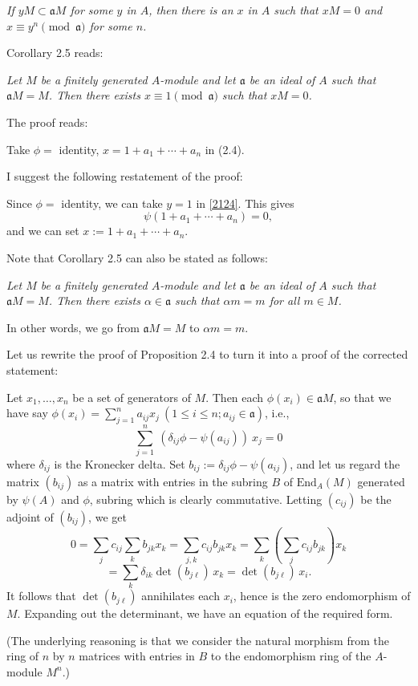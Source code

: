 \documentclass[parskip=half,fontsize=12pt]{scrartcl}%
\newcommand{\mf}{\mathfrak}
\newcommand{\aaa}{\mf a}
\begin{document}
\emph{If $yM\subset\aaa M$ for some $y$ in $A$, then there is an $x$ in $A$ such that $xM=0$ and $x\equiv y^n\pmod{\aaa}$ for some $n$.}

Corollary 2.5 reads:

\emph{Let $M$ be a finitely generated $A$-module and let $\aaa$ be an ideal of $A$ such that $\aaa M=M$. Then there exists $x\equiv1\pmod{\aaa}$ such that $xM=0$.}

The proof reads:

Take $\phi=$ identity, $x=1+a_1+\cdots+a_n$ in (2.4).

I suggest the following restatement of the proof:

Since $\phi=$ identity, we can take $y=1$ in \eqref{2124}. This gives 
$$
\psi(1+a_1+\cdots+a_n)=0,
$$ 
and we can set $x:=1+a_1+\cdots+a_n$.

Note that Corollary 2.5 can also be stated as follows:

\emph{Let $M$ be a finitely generated $A$-module and let $\aaa$ be an ideal of $A$ such that $\aaa M=M$. Then there exists $\alpha\in\aaa$ such that $\alpha m=m$ for all $m\in M$.}

In other words, we go from $\aaa M=M$ to $\alpha m=m$.

Let us rewrite the proof of Proposition 2.4 to turn it into a proof of the corrected statement:%

Let $x_1,\dots,x_n$ be a set of generators of $M$. Then each $\phi(x_i)\in\aaa M$, so that we have say $\phi(x_i)=\sum_{j=1}^na_{ij}x_j\ (1\le i\le n; a_{ij}\in\aaa)$, i.e., 
$$
\sum_{j=1}^n\ (\delta_{ij}\phi-\psi(a_{ij}))\ x_j=0
$$ 
where $\delta_{ij}$ is the Kronecker delta. Set $b_{ij}:=\delta_{ij}\phi-\psi(a_{ij})$, and let us regard the matrix $(b_{ij})$ as a matrix with entries in the subring $B$ of $\text{End}_A(M)$ generated by $\psi(A)$ and $\phi$, subring which is clearly commutative. Letting $(c_{ij})$ be the adjoint of $(b_{ij})$, we get 
$$
0=\sum_jc_{ij}\sum_kb_{jk}x_k=\sum_{j,k}c_{ij}b_{jk}x_k=\sum_k\left(\sum_jc_{ij}b_{jk}\right)x_k
$$ 
$$
=\sum_k\delta_{ik}\det(b_{j\ell})\,x_k=\det(b_{j\ell})\,x_i.
$$ %
It follows that $\det(b_{j\ell})$ annihilates each $x_i$, hence is the zero endomorphism of $M$. Expanding out the determinant, we have an equation of the required form.

(The underlying reasoning is that we consider the natural morphism from the ring of $n$ by $n$ matrices with entries in $B$ to the endomorphism ring of the $A$-module $M^n$.)
\end{document}
